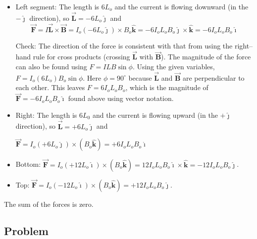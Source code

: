 \documentclass{article}
\newcommand{\ihat}[0]{\hat{\boldsymbol{\imath}}}
\newcommand{\jhat}[0]{\hat{\boldsymbol{\jmath}}}
\newcommand{\khat}[0]{\hat{\boldsymbol{k}}}
\newcommand{\bfvec}[1]{\vec{\mathbf{#1}}}
\begin{document}


\begin{itemize}

  \item Left segment: The length is $6L_o$ and the current is flowing downward (in the $-\jhat$ direction), so $\bfvec{L} = -6L_o\jhat$ and $$\bfvec{F} = I\bfvec{L}\times\bfvec{B} = I_o(-6L_o\jhat)\times B_o\khat=-6I_oL_oB_o\jhat\times \khat=-6I_oL_oB_o\ihat$$

        Check: The direction of the force is consistent with that from using the right--hand rule for cross products (crossing $\bfvec{L}$ with $\bfvec{B}$). The magnitude of the force can also be found using $F=ILB\sin\phi$. Using the given variables, $F=I_o(6L_o)B_o\sin\phi$. Here $\phi=90^\circ$ because $\bfvec{L}$ and $\bfvec{B}$ are perpendicular to each other. This leaves $F=6I_oL_oB_o$, which is the magnitude of $\bfvec{F}=-6I_oL_oB_o\ihat$ found above using vector notation.

  \item Right: The length is $6L_0$ and the current is flowing upward (in the $+\jhat$ direction), so $\bfvec{L} = +6L_o\jhat$ and

        $\bfvec{F}=I_o(+6L_o\jhat)\times (B_o\khat)=+6I_oL_oB_o\ihat$

  \item Bottom: $\bfvec{F}=I_o(+12L_o\ihat)\times (B_o\khat) = 12I_oL_oB_o\ihat\times\khat = -12I_oL_oB_o\jhat$.

  \item Top: $\bfvec{F}=I_o(-12L_o\ihat)\times (B_o\khat)=+12I_oL_oB_o\jhat$.

\end{itemize}

The sum of the forces is zero.

\subsection{Problem}

\ifsolutions

\else


\fi
\end{document}
